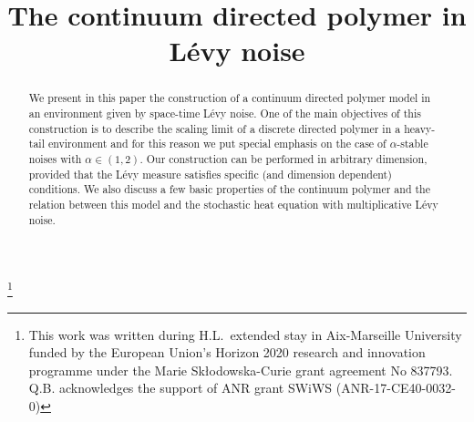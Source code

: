 \documentclass[JEP,XML,SOM,Unicode,published]{cedram}
\theoremstyle{definition}
\begin{document}
\frontmatter
\title{The continuum directed polymer in Lévy noise}

\author[\initial{Q.} \lastname{Berger}]{ }
\address{LPSM, Sorbonne Université, UMR 8001\\
Campus Pierre et Marie Curie, Boîte courrier 158, 4 Place Jussieu, 75252 Paris Cedex 05, France}

\author[\initial{H.} \lastname{Lacoin}]{ }
\address{IMPA, Institudo de Matemática Pura e Aplicada\\
Estrada Dona Castorina 110, Rio de Janeiro, CEP-22460-320, Brasil}
\urladdr{}

\thanks{This work was written during H.L.\ extended stay in Aix-Marseille University funded by the European Union’s Horizon 2020 research and innovation programme under the Marie Skłodowska-Curie grant agreement No 837793. Q.B. acknowledges the support of ANR grant SWiWS (ANR-17-CE40-0032-0)}



\begin{abstract}
We present in this paper the construction of a continuum directed polymer model in an environment given by space-time Lévy noise. One of the main objectives of this construction is to describe the scaling limit of a discrete directed polymer in a heavy-tail environment and for this reason we put special emphasis on the case of $\alpha$-stable noises with $\alpha \in (1,2)$. Our construction can be performed in arbitrary dimension, provided that the Lévy measure satisfies specific (and dimension dependent) conditions. We also discuss a few basic properties of the continuum polymer and the relation between this model and the stochastic heat equation with multiplicative Lévy noise.
\end{abstract}


\end{document}
